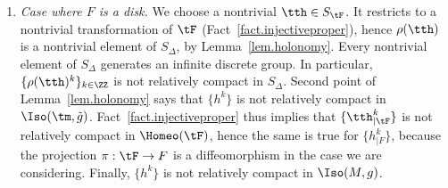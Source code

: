 \begin{enumerate}\alphenumi
\item \label{listprf8.15.a}\emph{Case where $F$ is a disk.} We choose a nontrivial $\tth \in S_{\tF}$. It restricts to a nontrivial transformation of $\tF$ (Fact~\ref{fact.injectiveproper}), hence $\rho(\tth)$ is a nontrivial element of $S_{\Delta}$, by Lemma~\ref{lem.holonomy}. Every nontrivial element of $S_{\Delta}$ generates an infinite discrete group. In particular, $\{\rho(\tth)^k\}_{k \in \ZZ}$ is not relatively compact in $S_{\Delta}$. Second point of Lemma~\ref{lem.holonomy} says that $\{h ^k \}$ is not relatively compact in $\Iso(\tm,\tilde{g})$. Fact~\ref{fact.injectiveproper} thus implies that $\{{\tth}^k_{|\tF}\}$ is not relatively compact in $\Homeo(\tF)$, hence the same is true for $\{h_{|F}^k \}$, because the projection $\pi: \tF\to F$ is a diffeomorphism in the case we are considering. Finally, $\{ h^k \}$ is not relatively compact in $\Iso(M,g)$.


\end{enumerate}
